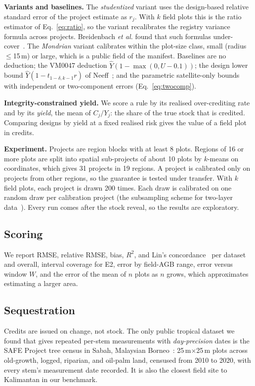 \documentclass[conference,a4paper]{IEEEtran}
\begin{document}
\textbf{Variants and baselines.} The \emph{studentized} variant uses the design-based relative standard error of the project estimate as $r_j$. With $k$ field plots this is the ratio estimator of Eq.~\ref{eq:ratio}, so the variant recalibrates the registry variance formula across projects. Breidenbach \textit{et al.} found that such formulas under-cover~\cite{breidenbach2016empirical}. The \emph{Mondrian} variant calibrates within the plot-size class, small (radius $\le$15\,m) or large, which is a public field of the manifest. Baselines are no deduction; the VM0047 deduction $\hat Y(1-\max(0,U-0.1))$; the design lower bound $\hat Y(1-t_{1-\delta,k-1}r)$ of Neeff~\cite{neeff2021risk}; and the parametric satellite-only bounds with independent or two-component errors (Eq.~\ref{eq:twocomp}).

\textbf{Integrity-constrained yield.} We score a rule by its realised over-crediting rate and by its \emph{yield}, the mean of $C_j/Y_j$: the share of the true stock that is credited. Comparing designs by yield at a fixed realised risk gives the value of a field plot in credits.

\textbf{Experiment.} Projects are region blocks with at least 8 plots. Regions of 16 or more plots are split into spatial sub-projects of about 10 plots by $k$-means on coordinates, which gives 31 projects in 19 regions. A project is calibrated only on projects from other regions, so the guarantee is tested under transfer. With $k$ field plots, each project is drawn 200 times. Each draw is calibrated on one random draw per calibration project (the subsampling scheme for two-layer data~\cite{dunn2023distribution}). Every run comes after the stock reveal, so the results are exploratory.

\subsection{Scoring}
We report RMSE, relative RMSE, bias, $R^2$, and Lin's concordance~\cite{lin1989concordance} per dataset and overall, interval coverage for E2, error by field-AGB range, error versus window $W$, and the error of the mean of $n$ plots as $n$ grows, which approximates estimating a larger area.

\subsection{Sequestration}
Credits are issued on change, not stock. The only public tropical dataset we found that gives repeated per-stem measurements with \emph{day-precision} dates is the SAFE Project tree census in Sabah, Malaysian Borneo~\cite{svatek2025safe,ewers2011safe}: 25\,m$\times$25\,m plots across old-growth, logged, riparian, and oil-palm land, censused from 2010 to 2020, with every stem's measurement date recorded. It is also the closest field site to Kalimantan in our benchmark.
\end{document}
